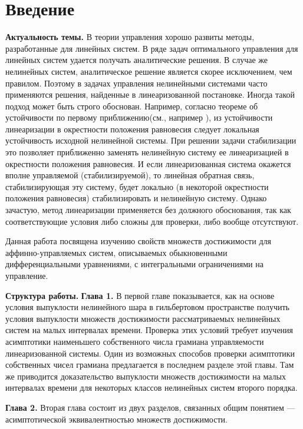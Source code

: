 \documentclass[../main.tex]{subfiles}
\begin{document}
\clearpage
\section*{Введение}
\textbf{Актуальность темы.} В теории управления хорошо развиты методы, разработанные для линейных систем. 
В ряде задач оптимального управления для линейных систем удается получать аналитические решения. 
В случае же нелинейных систем, аналитическое решение является скорее исключением, чем правилом. 
Поэтому в задачах управления нелинейными системами часто применяются решения, найденные в линеаризованной постановке. 
Иногда такой подход может быть строго обоснован. 
Например, согласно теореме об устойчивости по первому приближению(см., например \cite{Barbashin_book}), из устойчивости линеаризации в окрестности положения равновесия следует локальная устойчивость исходной нелинейной системы. 
При решении задачи стабилизации это позволяет приближенно заменять нелинейную систему ее линеаризацией в окрестности положения равновесия. 
И если линеаризованная система окажется вполне управляемой (стабилизируемой), то линейная обратная связь, стабилизирующая эту систему, будет локально (в некоторой окрестности положения равновесия) стабилизировать и нелинейную систему\cite{Kras_add, Stab_lectures, Khalil, Polyak_book}.  Однако зачастую, метод линеаризации применяется без должного обоснования, так как соответствующие условия либо сложны для проверки, либо вообще отсутствуют.

Данная работа посвящена изучению свойств множеств достижимости для аффинно-управляемых систем, описываемых обыкновенными дифференциальными уравнениями, с интегральными ограничениями на управление. 

\textbf{Структура работы.}  \textbf{Глава 1. }В первой главе показывается, как на основе условия выпуклости нелинейного шара в гильбертовом пространстве получить условия выпуклости множеств достижимости рассматриваемых нелинейных систем на малых интервалах времени. Проверка этих условий требует изучения асимптотики наименьшего собственного числа грамиана управляемости линеаризованной системы. Один из возможных способов проверки асимптотики собственных чисел грамиана предлагается в последнем разделе этой главы. Там же приводится доказательство выпуклости множеств достижимости на малых интервалах времени для некоторых классов нелинейных систем второго порядка. 

\textbf{Глава 2. }
Вторая глава состоит из двух разделов, связанных общим понятием --- асимптотической эквивалентностью множеств достижимости. 
\end{document}
